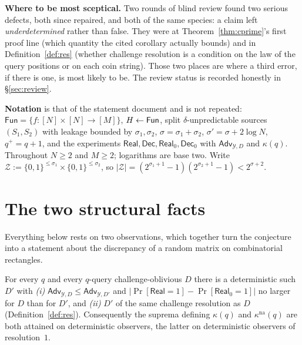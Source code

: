 \documentclass{aicr-solution}
\newcommand{\Fun}{\mathsf{Fun}}
\newcommand{\Adv}{\mathsf{Adv}}
\newcommand{\Real}{\mathsf{Real}}
\newcommand{\Dec}{\mathsf{Dec}}
\newcommand{\Prob}[1]{\Pr\!\left[#1\right]}
\newcommand{\bits}{\{0,1\}}
\newcommand{\kna}{\kappa^{\mathrm{na}}}
\begin{document}
\medskip

\noindent\textbf{Where to be most sceptical.} Two rounds of blind review found
two serious defects, both since repaired, and both of the same species: a
claim left \emph{underdetermined} rather than false. They were at
Theorem~\ref{thm:cprime}'s first proof line (which quantity the cited corollary
actually bounds) and in Definition~\ref{def:res} (whether challenge resolution is
a condition on the law of the query positions or on each coin string). Those two
places are where a third error, if there is one, is most likely to be. The review
status is recorded honestly in \S\ref{sec:review}.

\medskip

\noindent\textbf{Notation} is that of the statement document and is not repeated:
$\Fun=\{f:[N]\times[N]\to[M]\}$, $H\sample\Fun$, split $\delta$-unpredictable
sources $(S_1,S_2)$ with leakage bounded by $\sigma_1,\sigma_2$,
$\sigma=\sigma_1+\sigma_2$, $\sigma'=\sigma+2\log N$, $q^{+}=q+1$, and the
experiments $\Real,\Dec,\Real_0,\Dec_0$ with $\Adv_{\mathcal Y,D}$ and
$\kappa(q)$. Throughout $N\ge2$ and $M\ge2$; logarithms are base two. Write
$\mathcal Z:=\bits^{\le\sigma_1}\times\bits^{\le\sigma_2}$, so
$|\mathcal Z|=(2^{\sigma_1+1}-1)(2^{\sigma_2+1}-1)<2^{\sigma+2}$.

\section{The two structural facts}

Everything below rests on two observations, which together turn the conjecture
into a statement about the discrepancy of a random matrix on combinatorial
rectangles.

\begin{lemma}[derandomisation]\label{lem:derand}
For every $q$ and every $q$-query challenge-oblivious $D$ there is a
deterministic such $D'$ with \emph{(i)}
$\Adv_{\mathcal Y,D}\le\Adv_{\mathcal Y,D'}$ and
$\bigl|\Prob{\Real=1}-\Prob{\Real_0=1}\bigr|$ no larger for $D$ than for $D'$,
and \emph{(ii)} $D'$ of the same challenge resolution as $D$
(Definition~\ref{def:res}). Consequently the suprema defining $\kappa(q)$ and
$\kna(q)$ are both attained on deterministic observers, the latter on
deterministic observers of resolution~$1$.
\end{lemma}
\end{document}
